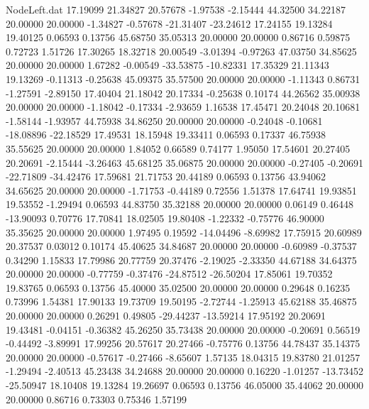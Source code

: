 \begin{filecontents}{NodeLeft.dat}
  17.19099   21.34827   20.57678    -1.97538   -2.15444   44.32500   34.22187   20.00000   20.00000   -1.34827   -0.57678  -21.31407  -23.24612
  17.24155   19.13284   19.40125     0.06593    0.13756   45.68750   35.05313   20.00000   20.00000    0.86716    0.59875    0.72723    1.51726
  17.30265   18.32718   20.00549    -3.01394   -0.97263   47.03750   34.85625   20.00000   20.00000    1.67282   -0.00549  -33.53875  -10.82331
  17.35329   21.11343   19.13269    -0.11313   -0.25638   45.09375   35.57500   20.00000   20.00000   -1.11343    0.86731   -1.27591   -2.89150
  17.40404   21.18042   20.17334    -0.25638    0.10174   44.26562   35.00938   20.00000   20.00000   -1.18042   -0.17334   -2.93659    1.16538
  17.45471   20.24048   20.10681    -1.58144   -1.93957   44.75938   34.86250   20.00000   20.00000   -0.24048   -0.10681  -18.08896  -22.18529
  17.49531   18.15948   19.33411     0.06593    0.17337   46.75938   35.55625   20.00000   20.00000    1.84052    0.66589    0.74177    1.95050
  17.54601   20.27405   20.20691    -2.15444   -3.26463   45.68125   35.06875   20.00000   20.00000   -0.27405   -0.20691  -22.71809  -34.42476
  17.59681   21.71753   20.44189     0.06593    0.13756   43.94062   34.65625   20.00000   20.00000   -1.71753   -0.44189    0.72556    1.51378
  17.64741   19.93851   19.53552    -1.29494    0.06593   44.83750   35.32188   20.00000   20.00000    0.06149    0.46448  -13.90093    0.70776
  17.70841   18.02505   19.80408    -1.22332   -0.75776   46.90000   35.35625   20.00000   20.00000    1.97495    0.19592  -14.04496   -8.69982
  17.75915   20.60989   20.37537     0.03012    0.10174   45.40625   34.84687   20.00000   20.00000   -0.60989   -0.37537    0.34290    1.15833
  17.79986   20.77759   20.37476    -2.19025   -2.33350   44.67188   34.64375   20.00000   20.00000   -0.77759   -0.37476  -24.87512  -26.50204
  17.85061   19.70352   19.83765     0.06593    0.13756   45.40000   35.02500   20.00000   20.00000    0.29648    0.16235    0.73996    1.54381
  17.90133   19.73709   19.50195    -2.72744   -1.25913   45.62188   35.46875   20.00000   20.00000    0.26291    0.49805  -29.44237  -13.59214
  17.95192   20.20691   19.43481    -0.04151   -0.36382   45.26250   35.73438   20.00000   20.00000   -0.20691    0.56519   -0.44492   -3.89991
  17.99256   20.57617   20.27466    -0.75776    0.13756   44.78437   35.14375   20.00000   20.00000   -0.57617   -0.27466   -8.65607    1.57135
  18.04315   19.83780   21.01257    -1.29494   -2.40513   45.23438   34.24688   20.00000   20.00000    0.16220   -1.01257  -13.73452  -25.50947
  18.10408   19.13284   19.26697     0.06593    0.13756   46.05000   35.44062   20.00000   20.00000    0.86716    0.73303    0.75346    1.57199

\end{filecontents}
